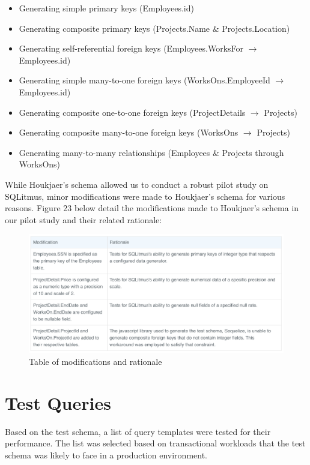 \documentclass[12pt]{report}
\begin{document}
\begin{spacing}{1.9}
\begin{itemize}
		\item Generating simple primary keys (Employees.id)
		\item Generating composite primary keys (Projects.Name \& Projects.Location)
		\item Generating self-referential foreign keys (Employees.WorksFor $\xrightarrow{}$ Employees.id)
		\item Generating simple many-to-one foreign keys (WorksOns.EmployeeId $\xrightarrow{}$ Employees.id)
		\item Generating composite one-to-one foreign keys (ProjectDetails $\xrightarrow{}$ Projects)
		\item Generating composite many-to-one foreign keys (WorksOns $\xrightarrow{}$ Projects)
		\item Generating many-to-many relationships (Employees \& Projects through WorksOns)
	\end{itemize}
	While Houkjaer's schema allowed us to conduct a robust pilot study on SQLitmus, minor modifications were made to Houkjaer's schema for various reasons. Figure 23 below detail the modifications made to Houkjaer's schema in our pilot study and their related rationale:
	
	
	\begin{figure}[H]
		\centering
		\includegraphics[width=\textwidth]{4-1b.png}
		\caption{Table of modifications and rationale}
		
	\end{figure}
	
	
	
	\pagebreak
	
	\section{Test Queries}
	
	Based on the test schema, a list of query templates were tested for their performance. The list was selected based on transactional workloads that the test schema was likely to face in a production environment.
	

\end{spacing}
\end{document}
